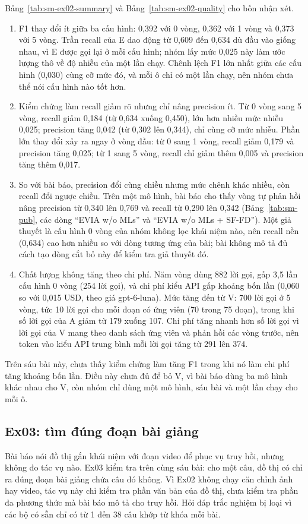 Bảng~\ref{tab:sm-ex02-summary} và Bảng~\ref{tab:sm-ex02-quality} cho bốn nhận xét.
\begin{enumerate}
\item F1 thay đổi ít giữa ba cấu hình: 0,392 với 0 vòng, 0,362 với 1 vòng và 0,373 với 5 vòng. Trần recall của E dao động từ 0,609 đến 0,634 dù đầu vào giống nhau, vì E được gọi lại ở mỗi cấu hình; nhóm lấy mức 0,025 này làm ước lượng thô về độ nhiễu của một lần chạy. Chênh lệch F1 lớn nhất giữa các cấu hình (0,030) cùng cỡ mức đó, và mỗi ô chỉ có một lần chạy, nên nhóm chưa thể nói cấu hình nào tốt hơn.
\item Kiểm chứng làm recall giảm rõ nhưng chỉ nâng precision ít. Từ 0 vòng sang 5 vòng, recall giảm 0,184 (từ 0,634 xuống 0,450), lớn hơn nhiều mức nhiễu 0,025; precision tăng 0,042 (từ 0,302 lên 0,344), chỉ cùng cỡ mức nhiễu. Phần lớn thay đổi xảy ra ngay ở vòng đầu: từ 0 sang 1 vòng, recall giảm 0,179 và precision tăng 0,025; từ 1 sang 5 vòng, recall chỉ giảm thêm 0,005 và precision tăng thêm 0,017.
\item So với bài báo, precision đổi cùng chiều nhưng mức chênh khác nhiều, còn recall đổi ngược chiều. Trên một mô hình, bài báo cho thấy vòng tự phản hồi nâng precision từ 0,340 lên 0,769 và recall từ 0,290 lên 0,342 (Bảng~\ref{tab:sm-pub}, các dòng ``EVIA w/o MLs'' và ``EVIA w/o MLs + SF-FD''). Một giả thuyết là cấu hình 0 vòng của nhóm không lọc khái niệm nào, nên recall nền (0,634) cao hơn nhiều so với dòng tương ứng của bài; bài không mô tả đủ cách tạo dòng cắt bỏ này để kiểm tra giả thuyết đó.
\item Chất lượng không tăng theo chi phí. Năm vòng dùng 882 lời gọi, gấp 3,5 lần cấu hình 0 vòng (254 lời gọi), và chi phí kiểu API gấp khoảng bốn lần (0,060 so với 0,015 USD, theo giá gpt-6-luna). Mức tăng đến từ V: 700 lời gọi ở 5 vòng, tức 10 lời gọi cho mỗi đoạn có ứng viên (70 trong 75 đoạn), trong khi số lời gọi của A giảm từ 179 xuống 107. Chi phí tăng nhanh hơn số lời gọi vì lời gọi của V mang theo danh sách ứng viên và phản hồi các vòng trước, nên token vào kiểu API trung bình mỗi lời gọi tăng từ 291 lên 374.
\end{enumerate}

Trên sáu bài này, chưa thấy kiểm chứng làm tăng F1 trong khi nó làm chi phí tăng khoảng bốn lần.
Điều này chưa đủ để bỏ V, vì bài báo dùng ba mô hình khác nhau cho V, còn nhóm chỉ dùng một mô hình, sáu bài và một lần chạy cho mỗi ô.

\subsection{Ex03: tìm đúng đoạn bài giảng}\label{sec:sm-ex03}
Bài báo nói đồ thị gắn khái niệm với đoạn video để phục vụ truy hồi, nhưng không đo tác vụ nào.
Ex03 kiểm tra trên cùng sáu bài: cho một câu, đồ thị có chỉ ra đúng đoạn bài giảng chứa câu đó không.
Vì Ex02 không chạy căn chỉnh ảnh hay video, tác vụ này chỉ kiểm tra phần văn bản của đồ thị, chưa kiểm tra phần đa phương thức mà bài báo mô tả cho truy hồi.
Hỏi đáp trắc nghiệm bị loại vì các bộ có sẵn chỉ có từ 1 đến 38 câu khớp từ khóa mỗi bài.

